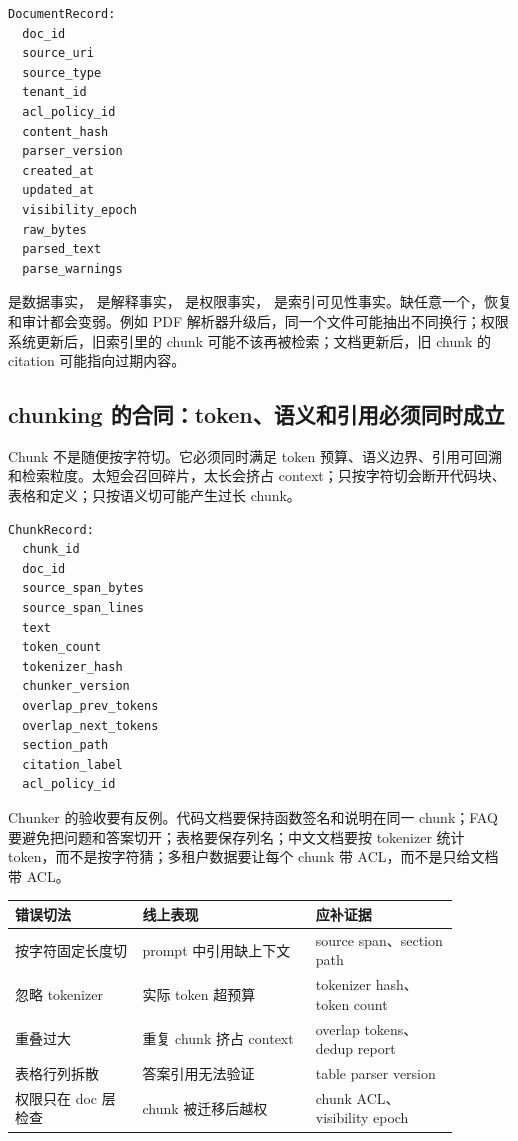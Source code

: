 \begin{lstlisting}[numbers=none,caption={DocumentRecord 最小字段}]
DocumentRecord:
  doc_id
  source_uri
  source_type
  tenant_id
  acl_policy_id
  content_hash
  parser_version
  created_at
  updated_at
  visibility_epoch
  raw_bytes
  parsed_text
  parse_warnings
\end{lstlisting}

 是数据事实， 是解释事实， 是权限事实， 是索引可见性事实。缺任意一个，恢复和审计都会变弱。例如 PDF 解析器升级后，同一个文件可能抽出不同换行；权限系统更新后，旧索引里的 chunk 可能不该再被检索；文档更新后，旧 chunk 的 citation 可能指向过期内容。

\subsection{chunking 的合同：token、语义和引用必须同时成立}

Chunk 不是随便按字符切。它必须同时满足 token 预算、语义边界、引用可回溯和检索粒度。太短会召回碎片，太长会挤占 context；只按字符切会断开代码块、表格和定义；只按语义切可能产生过长 chunk。

\begin{lstlisting}[numbers=none,caption={ChunkRecord 最小字段}]
ChunkRecord:
  chunk_id
  doc_id
  source_span_bytes
  source_span_lines
  text
  token_count
  tokenizer_hash
  chunker_version
  overlap_prev_tokens
  overlap_next_tokens
  section_path
  citation_label
  acl_policy_id
\end{lstlisting}

Chunker 的验收要有反例。代码文档要保持函数签名和说明在同一 chunk；FAQ 要避免把问题和答案切开；表格要保存列名；中文文档要按 tokenizer 统计 token，而不是按字符猜；多租户数据要让每个 chunk 带 ACL，而不是只给文档带 ACL。

\begin{center}
\small
\begin{tabular}{p{0.25\linewidth}p{0.34\linewidth}p{0.29\linewidth}}
\toprule
错误切法 & 线上表现 & 应补证据 \\
\midrule
按字符固定长度切 & prompt 中引用缺上下文 & source span、section path \\
忽略 tokenizer & 实际 token 超预算 & tokenizer hash、token count \\
重叠过大 & 重复 chunk 挤占 context & overlap tokens、dedup report \\
表格行列拆散 & 答案引用无法验证 & table parser version \\
权限只在 doc 层检查 & chunk 被迁移后越权 & chunk ACL、visibility epoch \\
\bottomrule
\end{tabular}
\end{center}

